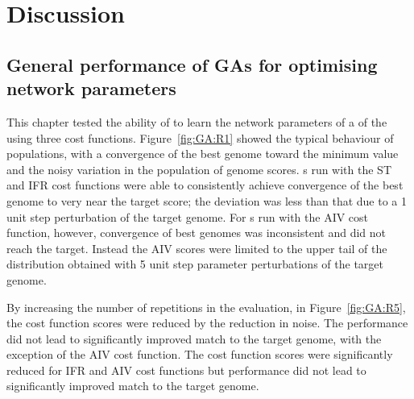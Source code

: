 



\section{Discussion}\label{sec:GA:discussion}

\subsection[General performance of {GA}s]{General performance of {GA}s for optimising network
  parameters}\label{sec:GA:general-perf-disc}

This chapter tested the ability of  to learn the network
parameters of a  of the {\CN} using three cost
functions. Figure~\ref{fig:GA:R1} showed the typical behaviour of {\GA}
populations, with a convergence of the best genome toward the minimum value
and the noisy variation in the population of genome scores. {\GA}s run with
the ST and IFR cost functions were able to consistently achieve convergence
of the best genome to very near the target score; the deviation was less
than that due to a 1 unit step perturbation of the target genome. For
{\GA}s run with the AIV cost function, however, convergence of best genomes
was inconsistent and did not reach the target. Instead the AIV scores were
limited to the upper tail of the distribution obtained with 5 unit step
parameter perturbations of the target genome.

\smallskip{}

By increasing the number of repetitions in the {\GA} evaluation, in
Figure~\ref{fig:GA:R5}, the cost function scores were reduced by the
reduction in noise. The {\GA} performance did not lead to significantly
improved match to the target genome, with the exception of the AIV cost
function.  The cost function scores were significantly reduced for IFR and
AIV cost functions but {\GA} performance did not lead to significantly
improved match to the target genome.


